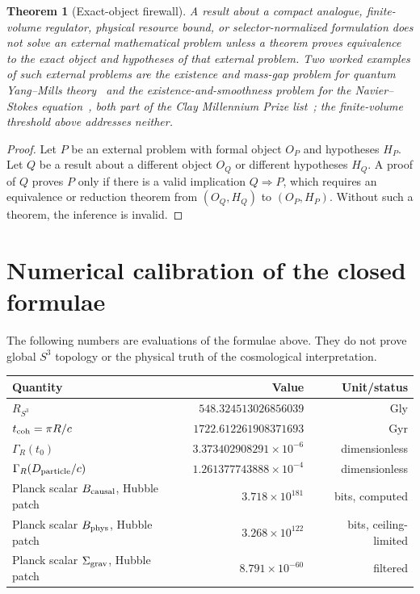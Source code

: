 \documentclass[11pt,a4paper]{article}
\newtheorem{theorem}{Theorem}[section]
\begin{document}
\begin{theorem}[Exact-object firewall]
A result about a compact analogue, finite-volume regulator, physical resource bound, or selector-normalized formulation does not solve an external mathematical problem unless a theorem proves equivalence to the exact object and hypotheses of that external problem.  Two worked examples of such external problems are the existence and mass-gap problem for quantum Yang--Mills theory~\cite{ClayYM} and the existence-and-smoothness problem for the Navier--Stokes equation~\cite{ClayNS}, both part of the Clay Millennium Prize list~\cite{ClayMillennium}; the finite-volume threshold above addresses neither.
\end{theorem}
\begin{proof}
Let $P$ be an external problem with formal object $O_P$ and hypotheses $H_P$.  Let $Q$ be a result about a different object $O_Q$ or different hypotheses $H_Q$.  A proof of $Q$ proves $P$ only if there is a valid implication $Q\Rightarrow P$, which requires an equivalence or reduction theorem from $(O_Q,H_Q)$ to $(O_P,H_P)$.  Without such a theorem, the inference is invalid.\end{proof}

\section{Numerical calibration of the closed formulae}

The following numbers are evaluations of the formulae above.  They do not prove global $S^3$ topology or the physical truth of the cosmological interpretation.

\begin{center}
\begin{tabular}{lrr}
\toprule
Quantity & Value & Unit/status\\
\midrule
$R_{S^3}$ & $548.324513026856039$ & Gly\\
$t_{\rm coh}=\pi R/c$ & $1722.612261908371693$ & Gyr\\
$\Gamma_R(t_0)$ & $3.373402908291\times10^{-6}$ & dimensionless\\
$\Gamma_R(D_{\rm particle}/c)$ & $1.261377743888\times10^{-4}$ & dimensionless\\
Planck scalar $B_{\rm causal}$, Hubble patch & $3.718\times10^{181}$ & bits, computed\\
Planck scalar $B_{\rm phys}$, Hubble patch & $3.268\times10^{122}$ & bits, ceiling-limited\\
Planck scalar $\Sigma_{\rm grav}$, Hubble patch & $8.791\times10^{-60}$ & filtered\\
\bottomrule
\end{tabular}
\end{center}
\end{document}
